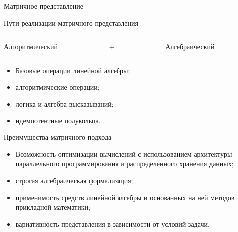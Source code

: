 \documentclass{beamer}
\begin{document}
\begin{darkframes}
\begin{frame}[label=simmonshall]{Матричное представление}

		\end{frame}

	\begin{frame}{Пути реализации матричного представления }
	\centering
			\begin{columns}[onlytextwidth]
				\begin{column}{0.3\columnwidth}
				\centering
					\alert{Алгоритмический}
					
				\end{column}

				\begin{column}{0.3\columnwidth}
				\centering
					$+$
				\end{column}

				\begin{column}{0.3\columnwidth}
				\centering
					\alert{Алгебраический}
				\end{column}
			\end{columns}

			\begin{itemize}
				\item Базовые операции линейной алгебры;
				\item алгоритмические операции;
				\item логика и алгебра высказываний;
				\item идемпотентные полукольца.	
			\end{itemize}
		\end{frame}

		\begin{frame}{Преимущества матричного подхода}
			\begin{itemize}
				\justifying
				\item Возможность оптимизации вычислений с использованием архитектуры параллельного программирования и распределенного хранения данных;
				\item строгая алгебраическая формализация;
				\item применимость средств линейной алгебры и основанных на ней методов прикладной математики;
				\item вариативность представления в зависимости от условий задачи.
			\end{itemize}	
		
		\end{frame}



\end{darkframes}
\end{document}
